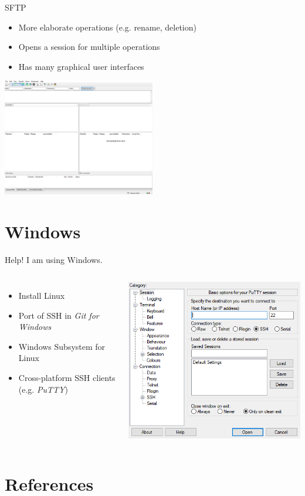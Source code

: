 \documentclass[10pt,graphics,aspectratio=169,table]{beamer}
\begin{document}
\begin{frame}[fragile]{SFTP}
	\begin{itemize}
		\item More elaborate operations (e.g. rename, deletion)
		\item Opens a session for multiple operations
		\item Has many graphical user interfaces
	\end{itemize}
	\begin{center}
		\includegraphics[width=0.5\textwidth]{img/filezilla.png} \cite{filezilla}
	\end{center}
\end{frame}

\section{Windows}
\begin{frame}[fragile]{Help! I am using Windows.}
\begin{columns}
	\begin{itemize}
		\item Install Linux
		\item Port of SSH in \textit{Git for Windows}
		\item Windows Subsystem for Linux
		\item Cross-platform SSH clients (e.g. \textit{PuTTY})
	\end{itemize}
	\includegraphics[height=0.7\paperheight]{img/putty.png} \cite{putty}
\end{columns}
\end{frame}

\section{References}
\begin{frame}[allowframebreaks]
	\printbibliography[heading=none]
\end{frame}
\end{document}
